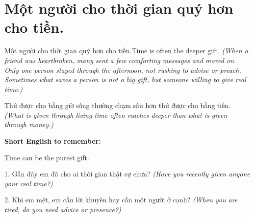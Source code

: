 \section{Một người cho thời gian quý hơn cho tiền.}
\begin{truyen}{Một người cho thời gian quý hơn cho tiền.}{Time is often the deeper gift.}
\textit{(When a friend was heartbroken, many sent a few comforting messages and moved on. Only one person stayed through the afternoon, not rushing to advise or preach. Sometimes what saves a person is not a big gift, but someone willing to give real time.)}
\end{truyen}
\begin{baihoc}
Thứ được cho bằng giờ sống thường chạm sâu hơn thứ được cho bằng tiền.
\textit{(What is given through living time often reaches deeper than what is given through money.)}
\end{baihoc}
\begin{ghinhoanh}
\textbf{Short English to remember:}

Time can be the purest gift.
\end{ghinhoanh}
\begin{tuhocnhanh}
1. Gần đây em đã cho ai thời gian thật sự chưa? \textit{(Have you recently given anyone your real time?)}

2. Khi em mệt, em cần lời khuyên hay cần một người ở cạnh? \textit{(When you are tired, do you need advice or presence?)}
\end{tuhocnhanh}
\ngancach

